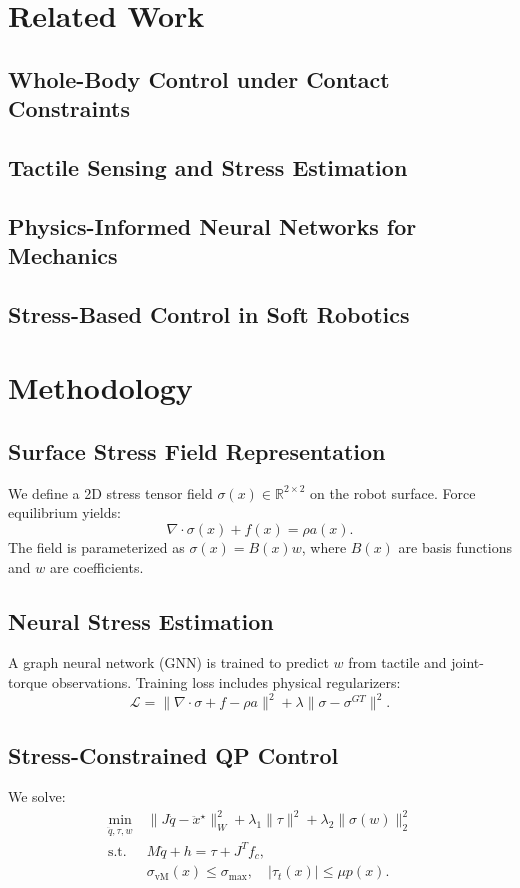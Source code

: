 \documentclass[conference]{IEEEtran}
\begin{document}
\section{Related Work}
\subsection{Whole-Body Control under Contact Constraints}
\subsection{Tactile Sensing and Stress Estimation}
\subsection{Physics-Informed Neural Networks for Mechanics}
\subsection{Stress-Based Control in Soft Robotics}

\section{Methodology}
\subsection{Surface Stress Field Representation}
We define a 2D stress tensor field $\sigma(x)\in\mathbb{R}^{2\times2}$ on the robot surface.
Force equilibrium yields:
\[
\nabla\cdot\sigma(x) + f(x) = \rho a(x).
\]
The field is parameterized as $\sigma(x) = B(x)w$, where $B(x)$ are basis functions and $w$ are coefficients.

\subsection{Neural Stress Estimation}
A graph neural network (GNN) is trained to predict $w$ from tactile and joint-torque observations.
Training loss includes physical regularizers:
\[
\mathcal{L} = \|\nabla\cdot\sigma + f - \rho a\|^2 + \lambda \|\sigma - \sigma^{GT}\|^2.
\]

\subsection{Stress-Constrained QP Control}
We solve:
\begin{align*}
\min_{\ddot q, \tau, w}\ &
\|J\ddot q - \ddot x^\star\|_W^2
+ \lambda_1\|\tau\|^2
+ \lambda_2\|\sigma(w)\|_2^2 \\
\text{s.t. } &
M\ddot q + h = \tau + J^T f_c,\\
& \sigma_{\text{vM}}(x) \le \sigma_{\max},\quad
|\tau_t(x)| \le \mu p(x).
\end{align*}
\end{document}
